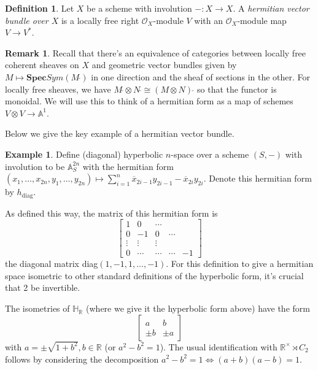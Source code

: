\documentclass[draftthesis,tocnosub,noragright,centerchapter,10pt]{uiucthesis2009}
\newcommand{\mbb}{\mathbb}
\newcommand{\mc}{\mathcal}
\newcommand{\dual}{\,\check{}}
\theoremstyle{plain}
\theoremstyle{definition}
\newtheorem{example}[lemma]{Example}
\newtheorem{definition}[lemma]{Definition}
\newtheorem{remark}[lemma]{Remark}
\begin{document}
\begin{definition}
Let $X$ be a scheme with involution $- : X \rightarrow X$. A
\emph{hermitian vector bundle over $X$} is a locally free right $\mc
O_X$-module $V$ with an $\mc O_X$-module map $V \rightarrow V^*$.
\end{definition}

\begin{remark}
  Recall that there's an equivalence of categories between locally
  free coherent sheaves on $X$ and geometric vector bundles given by
  $M \mapsto \mathbf{Spec}Sym(M\dual)$ in one direction and the sheaf
  of sections in the other. For locally free sheaves, we have $M\dual
  \otimes N\dual \cong (M \otimes N)\dual$ so that the functor is
  monoidal. We will use this to think of a hermitian
  form as a map of schemes $V \otimes V \rightarrow \mbb A^1$.
\end{remark}

Below we give the key example of a hermitian vector bundle.

\begin{example}

Define (diagonal) hyperbolic $n$-space over a scheme $(S,-)$ with involution to be $\mbb A^{2n}_S$
with the hermitian form $(x_1,\dots,x_{2n},y_1,\dots,y_{2n}) \mapsto
\sum_{i=1}^n  \overline x_{2i-1} y_{2i-1} -  \overline x_{2i}
y_{2i}$. Denote this hermitian form by $h_{\mathrm{diag}}$.

As defined this way, the matrix of this hermitian form is
\[
\begin{bmatrix}
1 & 0 & \cdots \\
0 & -1 & 0 & \cdots \\
\vdots & \vdots & \vdots \\
0 & \cdots & \cdots & \cdots & -1
\end{bmatrix}
\]
the diagonal matrix diag$(1,-1,1,\dots,-1)$. For this definition to
give a hermitian space isometric to other standard definitions of the
hyperbolic form, it's crucial that 2 be invertible. 

The isometries of $\mbb H_{\mbb R}$ (where we give it the hyperbolic
form above) have the form
\[
\begin{bmatrix}
a & b\\
\pm b & \pm a
\end{bmatrix}
\]
with $a = \pm\sqrt{1 + b^2}, b \in \mbb R$ (or $a^2 - b^2 = 1$). The
usual identification with $\mbb R^\times \rtimes C_2$ follows by
considering the decomposition $a^2 - b^2 = 1 \iff (a+b)(a-b) = 1$.
\end{example}
\end{document}
